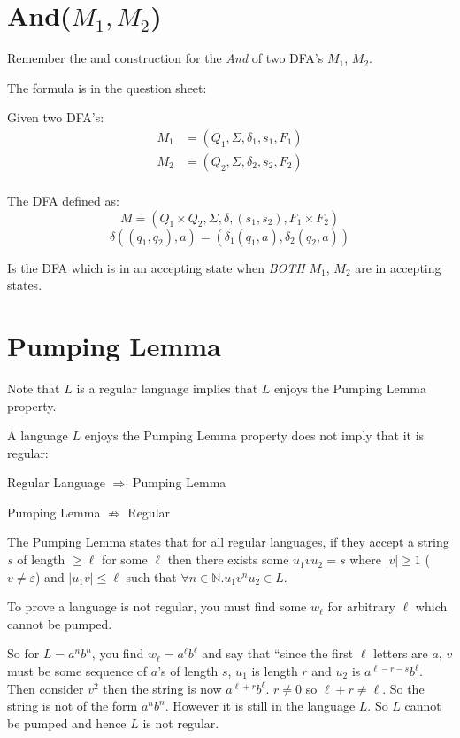 \documentclass[10pt, a4paper]{article}
\begin{document}
\section*{And($M_1, M_2$)}

Remember the and construction for the \textit{And} of two DFA's $M_1$, $M_2$.

The formula is in the question sheet:

Given two DFA's:
\[
\begin{split}
M_1 &= (Q_1, \Sigma, \delta_1, s_1, F_1) \\
M_2 &= (Q_2, \Sigma, \delta_2, s_2, F_2) \\
\end{split}
\]

The DFA defined as:
\[
M = (Q_1\times Q_2, \Sigma, \delta, (s_1, s_2), F_1\times F_2)
\]
\[
\delta((q_1, q_2), a) = (\delta_1(q_1, a), \delta_2(q_2, a))
\]

Is the DFA which is in an accepting state when \textit{BOTH} $M_1$, $M_2$ are in accepting states.

\vspace{0.5cm}

\section*{Pumping Lemma}

Note that $L$ is a regular language implies that $L$ enjoys the Pumping Lemma property. 

A language $L$ enjoys the Pumping Lemma property does not imply that it is regular:

\vspace{0.5cm}

Regular Language $\Longrightarrow$ Pumping Lemma

Pumping Lemma $\not\Longrightarrow$ Regular

The Pumping Lemma states that for all regular languages, if they accept a string $s$ 
of length $\geq \ell$ for some $\ell$ then there exists some $u_1 v u_2 = s$ where $|v| \geq 1$ ($v \neq \varepsilon$) 
and $|u_1v| \leq \ell$ such that $\forall n \in \mathbb{N}. u_1 v^n u_2 \in L$. 

To prove a language is not regular, you must find some $w_\ell$ for arbitrary $\ell$ 
which cannot be pumped. 

So for $L = a^nb^n$, you find $w_\ell = a^\ell b^\ell$ and say that ``since the first $\ell$ letters 
are $a$, $v$ must be some sequence of $a$'s of length $s$, $u_1$ is length $r$ and $u_2$ is $a^{\ell - r - s}b^\ell$. 
Then consider $v^2$ then the string is now $a^{\ell + r}b^\ell$. $r \neq 0$ so $\ell + r \neq \ell$. 
So the string is not of the form $a^nb^n$. However it is still in the language $L$. So $L$ cannot 
be pumped and hence $L$ is not regular.
\end{document}

